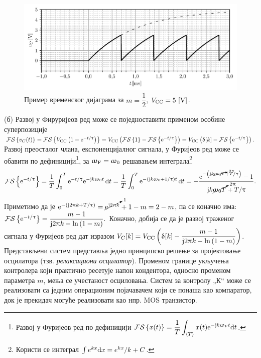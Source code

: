 \begin{figure}[ht!]
    \centering
    \includegraphics[scale=1]{fig/exp_osc_plot.pdf}
    \caption{Пример временског дијаграма за $m = \dfrac{1}{2}$, $V_{\rm CC} = 5\,\left[\mathrm{V}\right]$. }
    \label{fig:\ID.2}
\end{figure} 

(б) Развој у Фируријеов ред може се поједноставити применом особине суперпозиције
$\mathcal{FS}\left\{ v_C(t) \right\} = 
\mathcal{FS}\left\{ V_{\rm CC} \left(
    1 - {\rm e}^{-t/\uptau} \right) \right\} 
= V_{\rm CC} \left(
    \mathcal{FS}\left\{1\right\}
    -
    \mathcal{FS}\left\{
    {\rm e}^{-t/\uptau}    
    \right\}
\right) 
= V_{\rm CC} \left(
\updelta[k] 
-
\mathcal{FS}\left\{
    {\rm e}^{-t/\uptau}    
    \right\}
\right).
$ 
Развој преосталог члана, експоненцијалног сигнала, у Фуријеов ред може се обавити по 
дефиницији\footnote{
    Развој у Фуријеов ред по дефиницији 
    $\displaystyle\mathcal{FS}\left\{x(t)\right\} = \dfrac{1}{T}\int_{\langle T \rangle} x(t) {\rm e}^{-{\rm j} k \upomega_{\rm F} t} {\rm d} t$.
}, за $\upomega_{\rm F} = \upomega_0$
решавањем интеграла\footnote{Користи се интеграл 
    $\int e^{kx} {\rm d} x = e^{kx}/k + C$.
} 
\begin{equation}
    \mathcal{FS}\left\{
    {\rm e}^{-t/\uptau}    
    \right\}
    = \dfrac{1}{T}\int_0^T 
    {\rm e}^{-t/\uptau} {\rm e}^{-{\rm j} k \upomega_0 t} \,{\rm d} t
    =
    \dfrac{1}{T}\int_0^T 
    {\rm e}^{-\left( {\rm j} k\upomega_0  +  1/\uptau \right) t } \,{\rm d} t
    = 
    -\dfrac{
        {\rm e}^{-\left( {\rm j} k \cancelto{2\uppi}{\upomega_0 T}  +  T/\uptau \right) }
        - 1
    }{ {\rm j} k \cancelto{ 2\uppi }{\upomega_0 T}  +  T/\uptau }.
\end{equation}
Приметимо да је 
$
{\rm e}^{ -\left( {\rm j} 2\uppi k  +  T/\uptau \right)} 
= \cancelto{1}{{\rm e}^{{\rm j} 2\uppi k}} + {1-m} = 2 - m$, па се коначно има: 
$
\mathcal{FS}\left\{
    {\rm e}^{-t/\uptau}    
    \right\} =
    \dfrac{m - 1}{
        {\rm j} 2\uppi k - \ln\left( 1 - m \right)
    }.
$ Коначно, добија се да је развој траженог сигнала у Фуријеов ред дат изразом
$V_C[k] = 
V_{\rm CC} \left(
    \updelta[k] 
        - 
        \dfrac{m - 1}{
            {\rm j} 2\uppi k - \ln\left( 1 - m \right)
        }
\right)$. \\

Представљени систем представља једно принципско решење за пројектовање осцилатора 
(тзв. \textit{релаксациони осцилатор}). Променом границе укључења контролера који практично
ресетује напон кондентора, односно променом 
параметра $m$,
мења се учестаност осциловања. Систем за контролу „К“ може се реализовати са једним операционим
појачавачем који се понаша као компаратор, док је прекидач могуће реализовати као нпр. MOS 
транзистор. 
